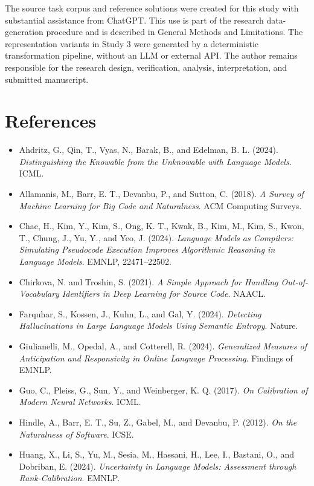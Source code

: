 \documentclass[sn-mathphys-num]{sn-jnl}
\begin{document}
The source task corpus and reference solutions were created for this study with substantial assistance from ChatGPT. This use is part of the research data-generation procedure and is described in General Methods and Limitations. The representation variants in Study 3 were generated by a deterministic transformation pipeline, without an LLM or external API. The author remains responsible for the research design, verification, analysis, interpretation, and submitted manuscript.

\section*{References}
\begin{enumerate}
\end{enumerate}

\begin{itemize}
\item Ahdritz, G., Qin, T., Vyas, N., Barak, B., and Edelman, B. L. (2024). \emph{Distinguishing the Knowable from the Unknowable with Language Models}. ICML.
\item Allamanis, M., Barr, E. T., Devanbu, P., and Sutton, C. (2018). \emph{A Survey of Machine Learning for Big Code and Naturalness}. ACM Computing Surveys.
\item Chae, H., Kim, Y., Kim, S., Ong, K. T., Kwak, B., Kim, M., Kim, S., Kwon, T., Chung, J., Yu, Y., and Yeo, J. (2024). \emph{Language Models as Compilers: Simulating Pseudocode Execution Improves Algorithmic Reasoning in Language Models}. EMNLP, 22471--22502.
\item Chirkova, N. and Troshin, S. (2021). \emph{A Simple Approach for Handling Out-of-Vocabulary Identifiers in Deep Learning for Source Code}. NAACL.
\item Farquhar, S., Kossen, J., Kuhn, L., and Gal, Y. (2024). \emph{Detecting Hallucinations in Large Language Models Using Semantic Entropy}. Nature.
\item Giulianelli, M., Opedal, A., and Cotterell, R. (2024). \emph{Generalized Measures of Anticipation and Responsivity in Online Language Processing}. Findings of EMNLP.
\item Guo, C., Pleiss, G., Sun, Y., and Weinberger, K. Q. (2017). \emph{On Calibration of Modern Neural Networks}. ICML.
\item Hindle, A., Barr, E. T., Su, Z., Gabel, M., and Devanbu, P. (2012). \emph{On the Naturalness of Software}. ICSE.
\item Huang, X., Li, S., Yu, M., Sesia, M., Hassani, H., Lee, I., Bastani, O., and Dobriban, E. (2024). \emph{Uncertainty in Language Models: Assessment through Rank-Calibration}. EMNLP.

\end{itemize}
\end{document}
